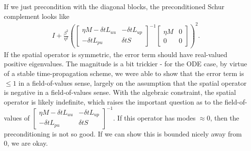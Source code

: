 \documentclass[a4paper,10pt]{article}
\begin{document}
%
If we just precondition with the diagonal blocks, the preconditioned 
Schur complement looks like
%
\begin{align*}
I + \frac{\beta^2}{\eta^2} \left(\begin{bmatrix} \eta M - \delta tL_{uu} & -\delta tL_{up} \\
		-\delta tL_{pu} & \delta tS \end{bmatrix}^{-1}
	\begin{bmatrix} \eta M & 0 \\ 0 & 0 \end{bmatrix} \right)^2.
\end{align*}
%
If the spatial operator is symmetric, the error term should have real-valued
positive eigenvalues. The magnitude is a bit trickier - for the ODE case,
by virtue of a stable time-propagation scheme, we were able to show that
the error term is $\leq 1$ in a field-of-values sense, largely on the
assumption that the spatial operator is negative in a field-of-values
sense. With the algebraic constraint, the spatial operator is likely
indefinite, which raises the important question as to the field-of-values
of $\begin{bmatrix} \eta M - \delta tL_{uu} & -\delta tL_{up} \\
-\delta tL_{pu} & \delta tS \end{bmatrix}^{-1}$. If this operator
has modes $\approx 0$, then the preconditioning is not so good. If we
can show this is bounded nicely away from 0, we are okay.
\end{document}
